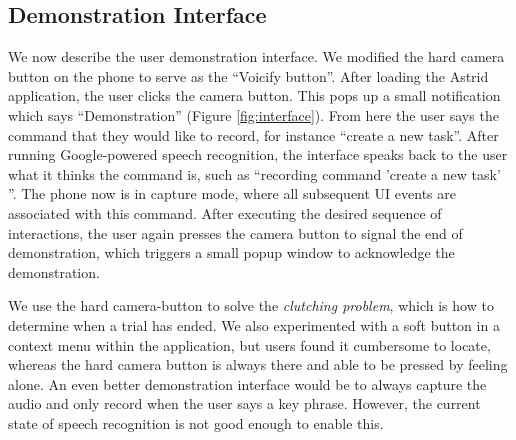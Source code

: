 \documentclass[letterpaper]{article}
\begin{document}

\subsection{Demonstration Interface}
We now describe the user demonstration interface. We modified the hard camera button on the phone to serve as the 
``Voicify button''. After loading the Astrid application, the user clicks the camera button. This pops up a small
notification which says ``Demonstration'' (Figure \ref{fig:interface}). From here the user says the command that they would like to record,
for instance ``create a new task''.
After running Google-powered speech recognition, the interface speaks back to the user what it thinks the command
is, such as ``recording command 'create a new task' ''. The phone now is in capture mode, where all subsequent
UI events are associated with this command. After executing the desired sequence of interactions, the user
again presses the camera button to signal the end of demonstration, which triggers a small popup window
to acknowledge the demonstration.

We use the hard camera-button to solve the \emph{clutching problem}, which is how to determine when a trial has ended.
We also experimented with a soft button in a context menu within the application, but users found it cumbersome
to locate, whereas the hard camera button is always there and able to be pressed by feeling alone.
An even better demonstration interface would be to always capture the audio and only record when the 
user says a key phrase. However, the current state of speech recognition is not good enough to enable this.
\end{document}
